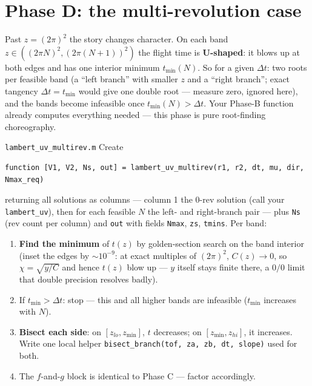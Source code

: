 \documentclass[11pt,letterpaper]{article}
\begin{document}
\section{Phase D: the multi-revolution case}

Past $z = (2\pi)^2$ the story changes character. On each band
$z \in ((2\pi N)^2, (2\pi(N{+}1))^2)$ the flight time is \textbf{U-shaped}:
it blows up at both edges and has one interior minimum $t_{\min}(N)$. So
for a given $\Delta t$: two roots per feasible band (a ``left branch''
with smaller $z$ and a ``right branch''; exact tangency
$\Delta t = t_{\min}$ would give one double root --- measure zero,
ignored here), and the bands become infeasible
once $t_{\min}(N) > \Delta t$. Your Phase-B function already computes
everything needed --- this phase is pure root-finding choreography.

\begin{exercise}{\texttt{lambert\_uv\_multirev.m}}
Create
\begin{verbatim}
function [V1, V2, Ns, out] = lambert_uv_multirev(r1, r2, dt, mu, dir, Nmax_req)
\end{verbatim}
returning all solutions as columns --- column 1 the 0-rev solution (call
your \texttt{lambert\_uv}), then for each feasible $N$ the left- and
right-branch pair --- plus \texttt{Ns} (rev count per column) and
\texttt{out} with fields \texttt{Nmax}, \texttt{zs}, \texttt{tmins}.
Per band:
\begin{enumerate}[leftmargin=1.5em,nosep]
\item \textbf{Find the minimum} of $t(z)$ by golden-section search on the
      band interior (inset the edges by $\sim$$10^{-9}$: at exact
      multiples of $(2\pi)^2$, $C(z) \to 0$, so $\chi = \sqrt{y/C}$ and
      hence $t(z)$ blow up --- $y$ itself stays finite there, a $0/0$
      limit that double precision resolves badly).
\item If $t_{\min} > \Delta t$: stop --- this and all higher bands are
      infeasible ($t_{\min}$ increases with $N$).
\item \textbf{Bisect each side}: on $[z_{lo}, z_{\min}]$, $t$ decreases;
      on $[z_{\min}, z_{hi}]$, it increases. Write one local helper
      \texttt{bisect\_branch(tof, za, zb, dt, slope)} used for both.
\item The $f$-and-$g$ block is identical to Phase C --- factor accordingly.
\end{enumerate}
\end{exercise}
\end{document}

